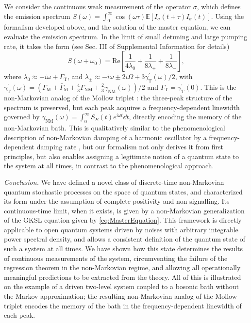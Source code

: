 \documentclass[
    11pt,
    letterpaper,
    reprint,
    notitlepage,
    superscriptaddress,
    aps,prx
]{revtex4-2}
\renewcommand{\mathbb}{\mathds}	%
\newcommand{\EE}{\mathbb{E}}
\begin{document}
We consider the continuous weak measurement of the operator $\sigma$, which defines the 
emission spectrum $S(\omega) = \int_0^\infty \cos(\omega \tau) \EE [ I_\sigma(t+ \tau) 
I_\sigma (t)]$.
Using the formalism developed above, and the solution of the master equation, we can evaluate
the emission spectrum.
In the limit of small detuning and large pumping rate, it takes the form
(see Sec. III of Supplemental Information \cite{Supplement} for details)
\begin{equation}\label{eq:NonMarkMollow}
    S(\omega + \omega_0) = \mathrm{Re}\!\left[\frac{1}{4\lambda_0} + \frac{1}{8\lambda_+} + \frac{1}{8\lambda_-}\right],
\end{equation}
where 
$\lambda_0 \approx -i\omega + \Gamma_\mathrm{T}$, 
and 
${\lambda_\pm \approx -i\omega \pm 2i\Omega  + 3\gamma^\prime_\mathrm{T}(\omega)/2}$, 
with $\gamma^\prime_\mathrm{T}(\omega) = (\Gamma_\mathrm{M} + \bar\Gamma_\mathrm{M} + \frac{4}{3} \Gamma_\mathrm{NM} +  \frac{2}{3}\gamma_\mathrm{NM}(\omega))/2$ and ${\Gamma_\mathrm{T} = \gamma^\prime_\mathrm{T}(0)}$. 
%
This is the non-Markovian analog of the Mollow triplet \cite{Mollow1969}: the three-peak 
structure of the spectrum is preserved, but each peak acquires a frequency-dependent 
linewidth governed by $\gamma_{\mathrm{NM}}(\omega) = \int_0^{\infty} S_E(t) e^{i \omega t} \dd{t}$, 
directly encoding the memory of the non-Markovian bath.
This is qualitatively similar to the phenomenological description of non-Markovian damping of a
harmonic oscillator by a frequency-dependent damping rate \cite{Saul90}, but our formalism
not only derives it from first principles, but also enables assigning a legitimate notion of a
quantum state to the system at all times, in contrast to the phenomenological approach.



\emph{Conclusion.}
We have defined a novel class of discrete-time non-Markovian quantum stochastic processes on 
the space of quantum states, and characterized its form under the assumption of complete positivity
and non-signalling.
Its continuous-time limit, when it exists, is given by a non-Markovian generalization of the
GKSL equation given by \cref{eq:MasterEquation}.
This framework is directly applicable to open quantum systems driven by noises with 
arbitrary integrable power spectral density, and allows a consistent definition of the 
quantum state of such a system at all times.
We have shown how this state determines the results of continuous measurements of the system, 
circumventing the failure of the regression theorem in the non-Markovian regime, and allowing all
operationally meaningful predictions to be extracted from the theory. 
All of this is illustrated on the example of a driven two-level system coupled to a bosonic
bath without the Markov approximation; the resulting non-Markovian analog of the Mollow triplet
encodes the memory of the bath in the frequency-dependent linewidth of each peak.
\end{document}
